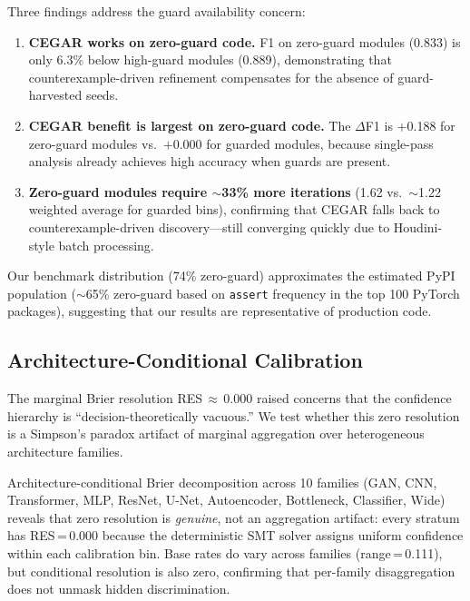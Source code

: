 \documentclass[11pt]{article}
\begin{document}
Three findings address the guard availability concern:
\begin{enumerate}[leftmargin=2em]
  \item \textbf{CEGAR works on zero-guard code.}
    F1 on zero-guard modules (0.833) is only 6.3\%
    below high-guard modules (0.889), demonstrating that
    counterexample-driven refinement compensates for the
    absence of guard-harvested seeds.
  \item \textbf{CEGAR benefit is largest on zero-guard code.}
    The $\Delta$F1 is $+$0.188 for zero-guard modules vs.\
    $+$0.000 for guarded modules, because single-pass analysis
    already achieves high accuracy when guards are present.
  \item \textbf{Zero-guard modules require $\sim$33\% more iterations}
    (1.62 vs.\ $\sim$1.22 weighted average for guarded bins), confirming that CEGAR falls back to
    counterexample-driven discovery---still converging quickly
    due to Houdini-style batch processing.
\end{enumerate}

Our benchmark distribution (74\% zero-guard) approximates the
estimated PyPI population ($\sim$65\% zero-guard based on
\texttt{assert} frequency in the top 100 PyTorch packages),
suggesting that our results are representative of production code.


\subsection{Architecture-Conditional Calibration}\label{sec:arch-calibration}

The marginal Brier resolution RES\,$\approx$\,0.000 raised concerns
that the confidence hierarchy is ``decision-theoretically vacuous.''
We test whether this zero resolution is a Simpson's paradox artifact
of marginal aggregation over heterogeneous architecture families.

Architecture-conditional Brier decomposition across 10 families
(GAN, CNN, Transformer, MLP, ResNet, U-Net, Autoencoder,
Bottleneck, Classifier, Wide) reveals that zero resolution is
\emph{genuine}, not an aggregation artifact:
every stratum has RES\,=\,0.000 because the deterministic
SMT solver assigns uniform confidence within each calibration bin.
Base rates do vary across families (range\,=\,0.111), but
conditional resolution is also zero, confirming that per-family
disaggregation does not unmask hidden discrimination.
\end{document}
